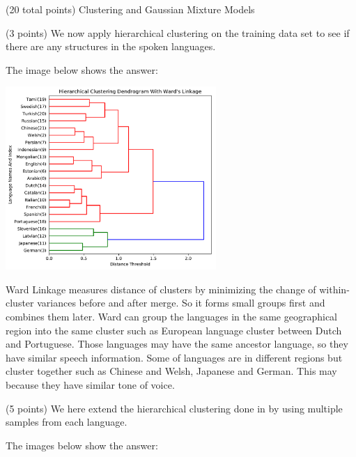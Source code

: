 \documentclass[12pt]{article}
\begin{document}
\begin{question}{(20 total points) Clustering and Gaussian Mixture Models}
\begin{subquestion}{(3 points)
       We now apply hierarchical clustering on the training data set
       to see if there are any structures in the spoken languages.
     }
     

      \begin{answerbox}{35em}
         The image below shows the answer:
         \begin{center}
         \includegraphics[width=0.6\textwidth]{Cluster2.pdf}
         \end{center}
         Ward Linkage measures distance of clusters by minimizing the change of within-cluster variances before and after merge. So it forms small groups first and combines them later. Ward can group the languages in the same geographical region into the same cluster such as European language cluster between Dutch and Portuguese. Those languages may have the same ancestor language, so they have similar speech information. Some of languages are in different regions but cluster together such as Chinese and Welsh, Japanese and German. This may because they have similar tone of voice.
      \end{answerbox}
  


   \end{subquestion}
   \begin{subquestion}{(5 points)
       We here extend the hierarchical clustering done in  by
       using multiple samples from each language.
     } \label{Q3.4}


   

      \begin{answerbox}{50em}
      The images below show the answer:\\
      

\end{answerbox}
\end{subquestion}
\end{question}
\end{document}
